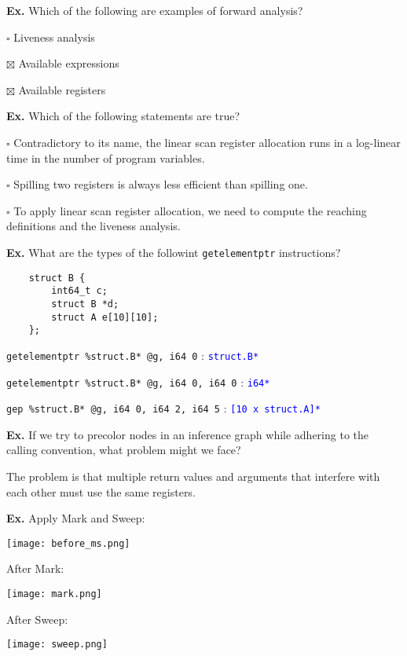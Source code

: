 \hrulefill

\textbf{Ex.} Which of the following are examples of forward analysis?
\begin{compactitem}
	\item[$\square$] Liveness analysis
	\item[$\boxtimes$] Available expressions
	\item[$\boxtimes$] Available registers
\end{compactitem}

\hrulefill

\textbf{Ex.} Which of the following statements are true?
\begin{compactitem}
	\item[$\square$] Contradictory to its name, the linear scan register allocation runs in a log-linear time in the number of program variables.
	\item[$\square$] Spilling two registers is always less efficient than spilling one.
	\item[$\square$] To apply linear scan register allocation, we need to compute the reaching definitions and the liveness analysis.
\end{compactitem}

\hrulefill

\textbf{Ex.} What are the types of the followint \texttt{getelementptr} instructions?
\begin{lstlisting}
	struct B {
		int64_t c;
		struct B *d;
		struct A e[10][10];
	}; 
\end{lstlisting}

\texttt{getelementptr \%struct.B* @g, i64 0} : \textcolor{blue}{\texttt{struct.B*}}

\texttt{getelementptr \%struct.B* @g, i64 0, i64 0} : \textcolor{blue}{\texttt{i64*}}

\texttt{gep \%struct.B* @g, i64 0, i64 2, i64 5} : \textcolor{blue}{\texttt{[10 x struct.A]*}}

\hrulefill

\textbf{Ex.} If we try to precolor nodes in an inference graph while adhering to the calling convention, what problem might we face?\medskip

The problem is that multiple return values and arguments that interfere with each other must use the same registers.

\hrulefill

\textbf{Ex.} Apply Mark and Sweep:

\vspace{-11pt}
\begin{center}
	\texttt{[image: before\_ms.png]}
\end{center}
\vspace{-20pt}
\begin{multicols*}{2}
	After Mark:

	\texttt{[image: mark.png]}

	After Sweep:

	\texttt{[image: sweep.png]}
\end{multicols*}


